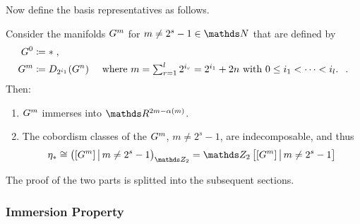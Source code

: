 Now define the basis representatives as follows.
\begin{Thm}\label{thm:brown}
  Consider the manifolds $G^{m}$ for $m\neq 2^s-1\in\Nat$ that are
  defined by
  \begin{align*}
    G^{0} &\coloneqq * \;, \\
    G^{m} &\coloneqq D_{2^{i_1}}({G^{n}})
        &\text{
          where
          $\textstyle m=\sum_{r=1}^l 2^{i_r}=2^{i_1}+2n$
          with $0\leq i_1<\dotsb<i_l$.
          }
          \;.
  \end{align*}
  Then:
  \begin{enumerate}
  \item\label{item:brownimmersionproperty} $G^{m}$ immerses into $\R^{2m-\alpha(m)}$.
  \item The cobordism classes of the $G^{m}$, $m\neq 2^s-1$, are
    indecomposable, and thus %
    \begin{gather*}
      \c_*\cong \left( [\G m] \,\big|\, m\neq 2^s-1 \right)_{\Zmod2}
      = \Zmod2\left[[\G m] \,\big|\, m\neq 2^s-1\right]
    \end{gather*}
  \end{enumerate}
\end{Thm}
The proof of the two parts is splitted into the subsequent sections.

\subsubsection{Immersion Property}

